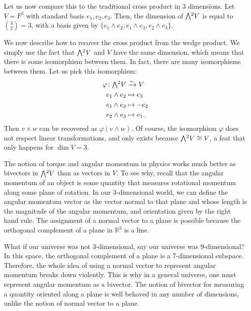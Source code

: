 \documentclass[11pt,oneside]{amsart}
\theoremstyle{definition}
\theoremstyle{plain}
\newcommand{\extp}{\mathchoice{{\textstyle\bigwedge}}%
    {{\bigwedge}}%
    {{\textstyle\wedge}}%
    {{\scriptstyle\wedge}}}
\newcommand{\bR}{\mathbb{R}}
\begin{document}
Let us now compare this to the traditional cross product in 3 dimensions. Let $V=F^3$ with standard basis $e_1,e_2,e_3$. Then, the dimension of $\extp^2 V$ is equal to $\binom 32=3$, with a basis given by $\{e_1\wedge e_2,e_1\wedge e_3,e_2\wedge e_3\}$.

We now describe how to recover the cross product from the wedge product. We simply use the fact that $\extp^2 V$ and $V$ have the same dimension, which means that there is some isomorphism between them. In fact, there are many isomorphisms between them. Let us pick this isomorphism:
\begin{align*}
    \varphi\colon \extp^2 V &\xrightarrow{\sim} V\\
    e_1\wedge e_2&\mapsto e_3\\
    e_1\wedge e_3 &\mapsto -e_2\\
    e_2\wedge e_3 &\mapsto e_1.
\end{align*}
Then $v\times w$ can be recovered as $\varphi(v\wedge w)$. Of course, the isomorphism $\varphi$ does not respect linear transformations, and only exists because $\extp^2 V\cong V$, a feat that only happens for $\dim V=3$.

The notion of torque and angular momentum in physics works much better as bivectors in $\extp^2 V$ than as vectors in $V$. To see why, recall that the angular momentum of an object is some quantity that measures rotational momentum along some plane of rotation. In our 3-dimensional world, we can define the angular momentum vector as the vector normal to that plane and whose length is the magnitude of the angular momentum, and orientation given by the right hand rule. The assignment of a normal vector to a plane is possible because the orthogonal complement of a plane in $\bR^3$ is a line.

What if our universe was not 3-dimensional, say our universe was 9-dimensional? In this space, the orthogonal complement of a plane is a 7-dimensional subspace. Therefore, the whole idea of using a normal vector to represent angular momentum breaks down violently. This is why in a general universe, one must represent angular momentum as a bivector. The notion of bivector for measuring a quantity oriented along a plane is well behaved in any number of dimensions, unlike the notion of normal vector to a plane.
\end{document}
